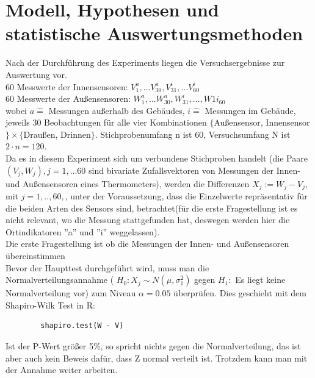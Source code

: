 \documentclass[ ngerman, fontsize= 12pt, paper=a4, headings=big, titlepage=true]{article}
\begin{document}
	
	
	\section{Modell, Hypothesen und statistische Auswertungsmethoden}
	Nach der Durchführung des Experiments liegen die Versuchsergebnisse zur Auswertung vor. \\
	60 Messwerte der Innensensoren:  $ V^a_{1}, ...V^a_{30}, V^i_{31}, ... V^i_{60} $   \\
	60 Messwerte der Außensensoren:  $ W^a_1, ...W^a_{30},W^i_{31},..., W1 i_{60} $ \\
	wobei $a \hat{=}$ Messungen außerhalb des Gebäudes,   $i \hat{=} $ Messungen im Gebäude, jeweils 30 Beobachtungen für alle vier Kombinationen $\{$Außensensor, Innensensor$\} \times \{$Draußen, Drinnen$\} $. Stichprobenumfang n ist 60, Versuchsumfang N ist $2 \cdot n =120 $. \\
	
	Da es in diesem Experiment sich um verbundene Stichproben handelt (die Paare $ ( V_j, W_j ), j = 1,...60 $ sind bivariate Zufallsvektoren von Messungen der Innen- und Außensensoren eines Thermometers), werden die Differenzen $ X_j := W_j - V_j,$ mit  $j = 1, .., 60, $, unter der Voraussetzung, dass die Einzelwerte repräsentativ für die beiden Arten des Sensors sind, betrachtet(für die erste Fragestellung ist es nicht relevant, wo die Messung stattgefunden hat, deswegen werden hier die Ortindikatoren ''a'' und ''i'' weggelassen). \\
	
	Die erste Fragestellung ist ob die Messungen der Innen- und Außensensoren übereinstimmen \\
	
	Bevor der Haupttest durchgeführt wird, muss man die Normalverteilungsannahme ( $ H_0: X_j  \sim N( \mu , \sigma_1^2 )$ gegen $H_1:$ Es liegt keine Normalverteilung vor) zum Niveau $ \alpha = 0.05 $  überprüfen. Dies geschieht mit dem Shapiro-Wilk Test in R:
	\begin{lstlisting}
		shapiro.test(W - V)
	\end{lstlisting}

	Ist der P-Wert größer 5\%, so spricht nichts gegen die Normalverteilung, das ist aber auch kein Beweis dafür, dass Z normal verteilt ist. Trotzdem kann man mit der Annahme weiter arbeiten. \\ 
	
\end{document}
